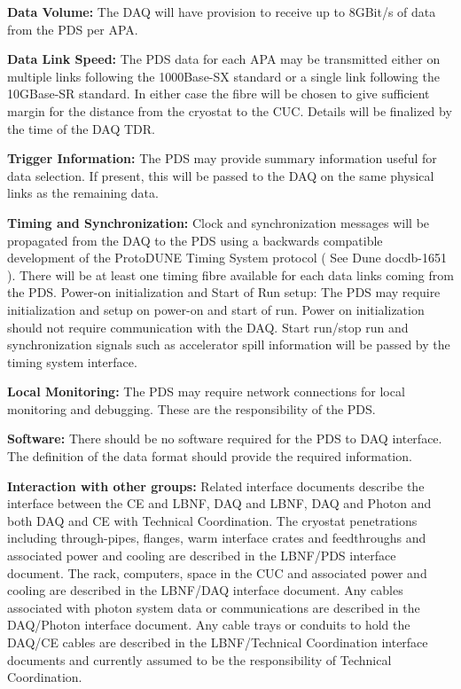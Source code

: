 \textbf{Data Volume:} The DAQ will have provision to receive up to 8GBit/s of data from the PDS per APA.

\textbf{Data Link Speed: }The PDS data for each APA may be transmitted either on multiple links following the 1000Base-SX standard or a single link following the 10GBase-SR standard. In either case the fibre will be chosen to give sufficient margin for the distance from the cryostat to the CUC. Details will be finalized by the time of the DAQ TDR.

\textbf{Trigger Information:} The PDS may provide summary information useful for data selection. If present, this will be passed to the DAQ on the same physical links as the remaining data.

\textbf{Timing and Synchronization: }Clock and synchronization messages will be propagated from the DAQ to the PDS using a backwards compatible development of the ProtoDUNE Timing System protocol ( See Dune docdb-1651 ). There will be at least one timing fibre available for each data links coming from the PDS. Power-on initialization and Start of Run setup:  The PDS may require initialization and setup on power-on and start of run. Power on initialization should not require communication with the DAQ. Start run/stop run and synchronization signals such as accelerator spill information will be passed by the timing system interface.

\textbf{Local Monitoring:} The PDS may require network connections for local monitoring and debugging. These are the responsibility of the PDS.

\textbf{Software:} There should be no software required for the PDS to DAQ interface. The definition of the data format should provide the required information. 

\textbf{Interaction with other groups: }Related interface documents describe the interface between the CE and LBNF, DAQ and LBNF, DAQ and Photon and both DAQ and CE with Technical Coordination. The cryostat penetrations including through-pipes, flanges, warm interface crates and feedthroughs and associated power and cooling are described in the LBNF/PDS interface document.  The rack, computers, space in the CUC and associated power and cooling are described in the LBNF/DAQ interface document. Any cables associated with photon system data or communications are described in the DAQ/Photon interface document. Any cable trays or conduits to hold the DAQ/CE cables are described in the LBNF/Technical Coordination interface documents and currently assumed to be the responsibility of Technical Coordination.


